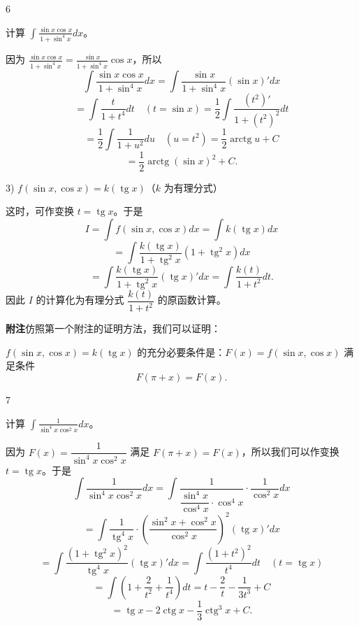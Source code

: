 \begin{sourceexample}{6}

	计算 \(\displaystyle\int\frac{\sin x\cos x}{1+\sin^4x}dx\)。

	因为 \(\displaystyle\frac{\sin x\cos x}{1+\sin^4x}=\frac{\sin x}{1+\sin^4x}\cos x\)，所以
	\[
	\int\frac{\sin x\cos x}{1+\sin^4x}dx=\int\frac{\sin x}{1+\sin^4x}(\sin x)'dx
	\]
	\[
	=\int\frac{t}{1+t^4}dt\quad(t=\sin x)=\frac12\int\frac{(t^2)'}{1+(t^2)^2}dt
	\]
	\[
	=\frac12\int\frac1{1+u^2}du\quad(u=t^2)=\frac12\operatorname{arctg}u+C
	\]
	\[
	=\frac12\operatorname{arctg}(\sin x)^2+C.
	\]

\end{sourceexample}

3) \(f(\sin x,\cos x)=k(\operatorname{tg}x)\)（\(k\) 为有理分式）

这时，可作变换 \(t=\operatorname{tg}x\)。于是
\[
I=\int f(\sin x,\cos x)dx=\int k(\operatorname{tg}x)dx
\]
\[
=\int\frac{k(\operatorname{tg}x)}{1+\operatorname{tg}^2x}(1+\operatorname{tg}^2x)dx
\]
\[
=\int\frac{k(\operatorname{tg}x)}{1+\operatorname{tg}^2x}(\operatorname{tg}x)'dx=\int\frac{k(t)}{1+t^2}dt.
\]
因此 \(I\) 的计算化为有理分式 \(\dfrac{k(t)}{1+t^2}\) 的原函数计算。

\textbf{附注}\quad 仿照第一个附注的证明方法，我们可以证明：

\(f(\sin x,\cos x)=k(\operatorname{tg}x)\) 的充分必要条件是：\(F(x)=f(\sin x,\cos x)\) 满足条件
\[
F(\pi+x)=F(x).
\]

\begin{sourceexample}{7}

	计算 \(\displaystyle\int\frac1{\sin^4x\cos^2x}dx\)。

	因为 \(F(x)=\dfrac1{\sin^4x\cos^2x}\) 满足 \(F(\pi+x)=F(x)\)，所以我们可以作变换 \(t=\operatorname{tg}x\)。于是
	\[
	\int\frac1{\sin^4x\cos^2x}dx=\int\frac1{\dfrac{\sin^4x}{\cos^4x}\cdot\cos^4x}\cdot\frac1{\cos^2x}dx
	\]
	\[
	=\int\frac1{\operatorname{tg}^4x}\cdot\left(\frac{\sin^2x+\cos^2x}{\cos^2x}\right)^2(\operatorname{tg}x)'dx
	\]
	\[
	=\int\frac{(1+\operatorname{tg}^2x)^2}{\operatorname{tg}^4x}(\operatorname{tg}x)'dx=\int\frac{(1+t^2)^2}{t^4}dt\quad(t=\operatorname{tg}x)
	\]
	\[
	=\int\left(1+\frac2{t^2}+\frac1{t^4}\right)dt=t-\frac2t-\frac1{3t^3}+C
	\]
	\[
	=\operatorname{tg}x-2\operatorname{ctg}x-\frac13\operatorname{ctg}^3x+C.
	\]

\end{sourceexample}

